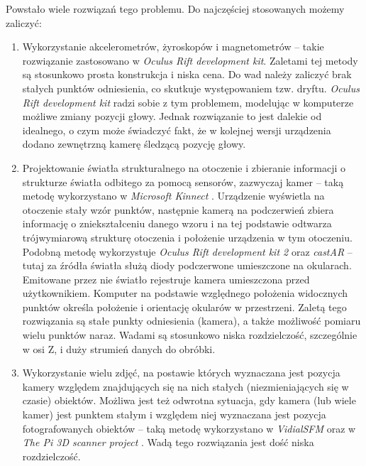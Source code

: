 Powstało wiele rozwiązań tego problemu. Do najczęściej stosowanych możemy zaliczyć:
\begin{enumerate}
 \item 
 Wykorzystanie akcelerometrów, żyroskopów i magnetometrów -- 
takie rozwiązanie zastosowano w \textit{Oculus Rift development kit}. Zaletami tej metody są stosunkowo
prosta konstrukcja i niska cena.
Do wad należy zaliczyć brak stałych punktów odniesienia, co skutkuje występowaniem tzw. dryftu.
\textit{Oculus Rift development kit} radzi sobie z tym problemem, modelując w komputerze możliwe zmiany pozycji głowy.
Jednak rozwiązanie to jest dalekie od idealnego, o czym może świadczyć fakt, że w kolejnej wersji 
urządzenia dodano zewnętrzną kamerę śledzącą pozycję głowy.

\item \label{itm:second_method}
 Projektowanie światła strukturalnego na otoczenie i zbieranie informacji o strukturze 
 światła odbitego za pomocą sensorów, zazwyczaj kamer -- 
 taką metodę wykorzystano w \textit{Microsoft Kinnect} \cite{bib:MicrosoftKinect}.
 Urządzenie wyświetla na otoczenie stały wzór punktów, następnie kamerą na podczerwień
 zbiera informację o zniekształceniu danego wzoru i na tej podstawie odtwarza  
 trójwymiarową strukturę otoczenia i położenie urządzenia w tym otoczeniu.
 Podobną metodę wykorzystuje \textit{Oculus Rift development kit 2} \cite{bib:OculusRiftDK2} oraz 
 \textit{castAR} \cite{bib:castAR} -- tutaj za źródła światła służą diody podczerwone umieszczone na okularach.
 Emitowane przez nie światło rejestruje kamera umieszczona przed użytkownikiem.
 Komputer na podstawie względnego położenia widocznych punktów określa położenie i orientację
 okularów w przestrzeni.
 Zaletą tego rozwiązania są stałe punkty odniesienia (kamera), a także możliwość pomiaru wielu punktów naraz.
 Wadami są stosunkowo niska rozdzielczość, szczególnie w osi Z, i duży strumień danych do obróbki.

\item
 Wykorzystanie wielu zdjęć, na postawie których 
 wyznaczana jest pozycja kamery względem znajdujących się na nich  stałych (niezmieniających się w czasie) obiektów. 
 Możliwa jest też odwrotna sytuacja, gdy  
  kamera (lub wiele kamer) jest punktem stałym i względem niej wyznaczana jest pozycja fotografowanych obiektów --   
 taką metodę wykorzystano w \textit{VidialSFM} \cite{bib:VisualSFM} oraz w \textit{The Pi 3D scanner project} \cite{bib:pi3dscan}. 
 Wadą tego rozwiązania jest dość niska rozdzielczość.
 

\end{enumerate}
